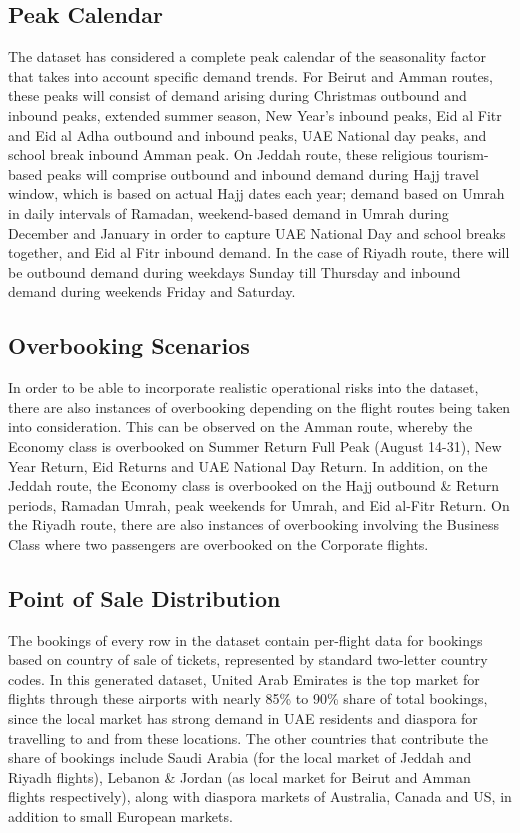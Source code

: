 \subsection{Peak Calendar}

The dataset has considered a complete peak calendar of the seasonality factor that takes into account specific demand trends. For Beirut and Amman routes, these peaks will consist of demand arising during Christmas outbound and inbound peaks, extended summer season, New Year's inbound peaks, Eid al Fitr and Eid al Adha outbound and inbound peaks, UAE National day peaks, and school break inbound Amman peak. On Jeddah route, these religious tourism-based peaks will comprise outbound and inbound demand during Hajj travel window, which is based on actual Hajj dates each year; demand based on Umrah in daily intervals of Ramadan, weekend-based demand in Umrah during December and January in order to capture UAE National Day and school breaks together, and Eid al Fitr inbound demand. In the case of Riyadh route, there will be outbound demand during weekdays Sunday till Thursday and inbound demand during weekends Friday and Saturday.

\subsection{Overbooking Scenarios}

In order to be able to incorporate realistic operational risks into the dataset, there are also instances of overbooking depending on the flight routes being taken into consideration. This can be observed on the Amman route, whereby the Economy class is overbooked on Summer Return Full Peak (August 14-31), New Year Return, Eid Returns and UAE National Day Return. In addition, on the Jeddah route, the Economy class is overbooked on the Hajj outbound \& Return periods, Ramadan Umrah, peak weekends for Umrah, and Eid al-Fitr Return. On the Riyadh route, there are also instances of overbooking involving the Business Class where two passengers are overbooked on the Corporate flights.

\subsection{Point of Sale Distribution}

The bookings of every row in the dataset contain per-flight data for bookings based on country of sale of tickets, represented by standard two-letter country codes. In this generated dataset, United Arab Emirates is the top market for flights through these airports with nearly 85\% to 90\% share of total bookings, since the local market has strong demand in UAE residents and diaspora for travelling to and from these locations. The other countries that contribute the share of bookings include Saudi Arabia (for the local market of Jeddah and Riyadh flights), Lebanon \& Jordan (as local market for Beirut and Amman flights respectively), along with diaspora markets of Australia, Canada and US, in addition to small European markets.

